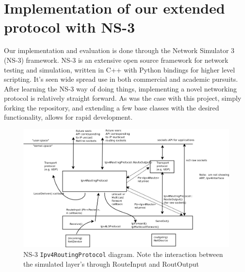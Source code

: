 \documentclass[12pt]{article} %
\newcommand{\prettycode}[1]
{\lstinline[basicstyle=\ttfamily]{#1}}
\begin{document}

\newpage %



\section{Implementation of our extended protocol with NS-3}

Our implementation and evaluation is done through the Network Simulator 3 (NS-3) framework. NS-3 is an extensive open source framework for network testing and simulation, written in C++ with Python bindings for higher level scripting. It's seen wide spread use in both commercial and academic pursuits. After learning the NS-3 way of doing things, implementing a novel networking protocol is relatively straight forward. As was the case with this project, simply forking the repository, and extending a few base classes with the desired functionality, allows for rapid development.

\begin{figure}[ht!]
\includegraphics[width=160mm]{routing.png}
\caption{NS-3 \prettycode{Ipv4RoutingProtocol} diagram. Note the interaction between the simulated layer's through RouteInput and RoutOutput\cite{ns-3-routing}}
\end{figure}
\end{document}
